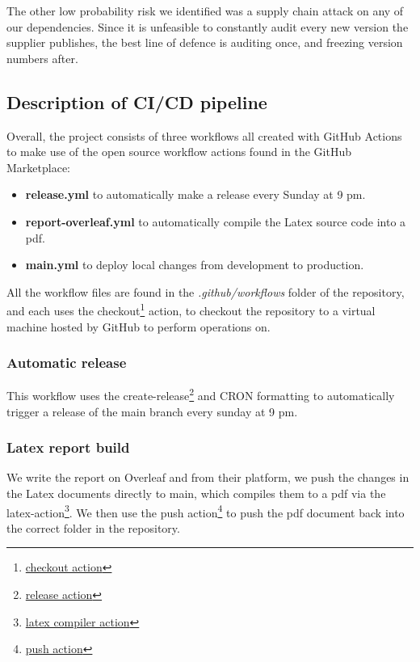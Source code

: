 \documentclass[report/main.tex]{subfiles}
\begin{document}
            The other low probability risk we identified was a supply chain attack on any of our dependencies. Since it is unfeasible to constantly audit every new version the supplier publishes, the best line of defence is auditing once, and freezing version numbers after.
        
        \subsection{Description of CI/CD pipeline}
            Overall, the project consists of three workflows all created with GitHub Actions to make use of the open source workflow actions found in the GitHub Marketplace:
            
            \begin{itemize} 
                \item \textbf{release.yml} to automatically make a release every Sunday at 9 pm. 
                \item \textbf{report-overleaf.yml} to automatically compile the Latex source code into a pdf.
                \item \textbf{main.yml} to deploy local changes from development to production.
            \end{itemize}
            
            All the workflow files are found in the \textit{.github/workflows} folder of the repository, and each uses the checkout\footnote{\href{https://github.com/actions/checkout}{checkout action}} action, to checkout the repository to a virtual machine hosted by GitHub to perform operations on. 
        
            \subsubsection{Automatic release}
                This workflow uses the create-release\footnote{\href{https://github.com/actions/create-release}{release action}} and CRON formatting to automatically trigger a release of the main branch every sunday at 9 pm. 
        
            \subsubsection{Latex report build}
                We write the report on Overleaf and from their platform, we push the changes in the Latex documents directly to main, which compiles them to a pdf via the latex-action\footnote{\href{https://github.com/xu-cheng/latex-action}{latex compiler action}}. We then use the push action\footnote{\href{https://github.com/ad-m/github-push-action}{push action}} to push the pdf document back into the correct folder in the repository. 
            
\end{document}
